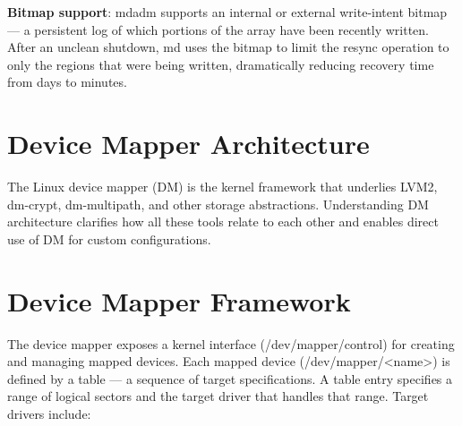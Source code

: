 \textbf{Bitmap support}: mdadm supports an internal or external write-intent bitmap --- a persistent log of which portions of the array have been recently written. After an unclean shutdown, md uses the bitmap to limit the resync operation to only the regions that were being written, dramatically reducing recovery time from days to minutes.

\section{Device Mapper Architecture}
The Linux device mapper (DM) is the kernel framework that underlies LVM2, dm-crypt, dm-multipath, and other storage abstractions. Understanding DM architecture clarifies how all these tools relate to each other and enables direct use of DM for custom configurations.

\section{Device Mapper Framework}
The device mapper exposes a kernel interface (/dev/mapper/control) for creating and managing mapped devices. Each mapped device (/dev/mapper/\textless name\textgreater) is defined by a table --- a sequence of target specifications. A table entry specifies a range of logical sectors and the target driver that handles that range. Target drivers include:

